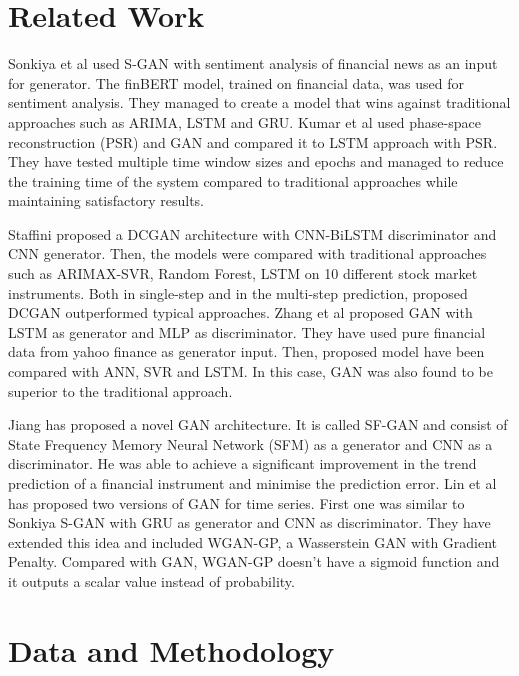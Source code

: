 \documentclass[11pt]{article} %
\begin{document}
\section{Related Work}
Sonkiya et al \cite{s-gan} used S-GAN with sentiment analysis of financial news as an input for generator. The finBERT model, trained on financial data, was used for sentiment analysis. They managed to create a model that wins against traditional approaches such as ARIMA, LSTM and GRU. Kumar et al  \cite{gan-stock} used phase-space reconstruction (PSR) and GAN and compared it to LSTM approach with PSR. They have tested multiple time window sizes and epochs and managed to reduce the training time of the system compared to traditional approaches while maintaining satisfactory results.

Staffini \cite{gan-cnn} proposed a DCGAN architecture with CNN-BiLSTM discriminator and CNN generator. Then, the models were compared with traditional approaches such as ARIMAX-SVR, Random Forest, LSTM on 10 different stock market instruments. Both in single-step and in the multi-step prediction, proposed DCGAN outperformed typical approaches. Zhang et al \cite{gan-zhang} proposed GAN with LSTM as generator and MLP as discriminator. They have used pure financial data from yahoo finance as generator input. Then, proposed model have been compared with ANN, SVR and LSTM. In this case, GAN was also found to be superior to the traditional approach. 

Jiang \cite{gan-Jjang} has proposed a novel GAN architecture. It is called SF-GAN and consist of 
State Frequency Memory Neural Network (SFM) as a generator and CNN as a discriminator. 
He was able to achieve a significant improvement in the trend prediction of a financial instrument and minimise the prediction error.  Lin et al \cite{gan-lin} has proposed two versions of GAN for time series. First one was similar to Sonkiya S-GAN with GRU as generator and CNN as discriminator. They have extended this idea and included WGAN-GP, a Wasserstein GAN with Gradient Penalty. Compared with GAN, WGAN-GP doesn't have a sigmoid function and it outputs a scalar value instead of probability.



\section{Data and Methodology}
\end{document}
